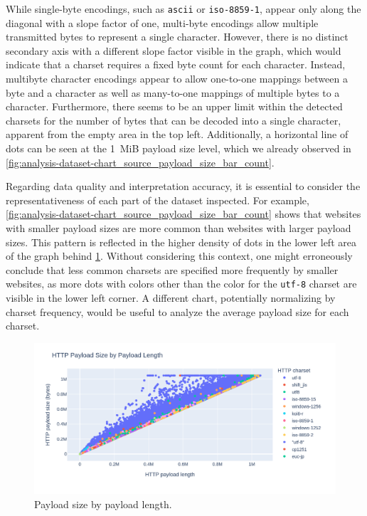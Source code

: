While single-byte encodings, such as \texttt{ascii} or \texttt{iso-8859-1}, appear only along the diagonal with a slope factor of one, multi-byte encodings allow multiple transmitted bytes to represent a single character.
However, there is no distinct secondary axis with a different slope factor visible in the graph, which would indicate that a charset requires a fixed byte count for each character.
Instead, multibyte character encodings appear to allow one-to-one mappings between a byte and a character as well as many-to-one mappings of multiple bytes to a character.
Furthermore, there seems to be an upper limit within the detected charsets for the number of bytes that can be decoded into a single character, apparent from the empty area in the top left.
Additionally, a horizontal line of dots can be seen at the 1~MiB payload size level, which we already observed in \cref{fig:analysis-dataset-chart_source_payload_size_bar_count}.

Regarding data quality and interpretation accuracy, it is essential to consider the representativeness of each part of the dataset inspected.
For example, \cref{fig:analysis-dataset-chart_source_payload_size_bar_count} shows that websites with smaller payload sizes are more common than websites with larger payload sizes.
This pattern is reflected in the higher density of dots in the lower left area of the graph behind \cref{fig:analysis-dataset-chart_source_payload_size_scatter_payload_length}.
Without considering this context, one might erroneously conclude that less common charsets are specified more frequently by smaller websites, as more dots with colors other than the color for the \texttt{utf-8} charset are visible in the lower left corner.
A different chart, potentially normalizing by charset frequency, would be useful to analyze the average payload size for each charset.

\begin{figure}[H]
    \centering
    \includegraphics[width=\textwidth]{figures/charts/large/chart_source_payload_size_scatter_payload_length.png}
    \caption{Payload size by payload length.}
    \label{fig:analysis-dataset-chart_source_payload_size_scatter_payload_length}
\end{figure}

